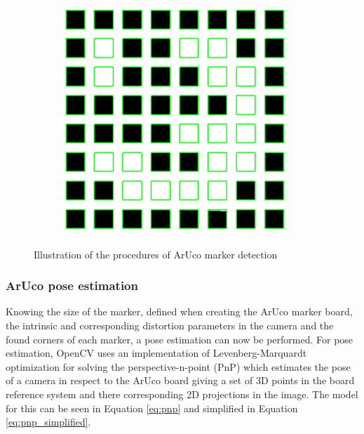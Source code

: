 \documentclass[../Head/report.tex]{subfiles}
\begin{document}
\begin{figure}[H]
\begin{subfigure}[b]{.15\textwidth}
        \caption{}
        \label{fig:aruco_detection4}
    \end{subfigure}
        \begin{subfigure}[b]{.154\textwidth}
        \centering
        \includegraphics[width=1\linewidth]{../Figures/aruco_detection5.png}
        \caption{}
        \label{fig:aruco_detection5}
         \vspace{-0.05cm}
    \end{subfigure}
    \caption{Illustration of the procedures of ArUco marker detection \cite{arucoMarkerDetection}}
    \label{fig:aruco_detection_procedure}
  
\end{figure}

\subsubsection{ArUco pose estimation}

Knowing the size of the marker, defined when creating the ArUco marker board, the intrinsic and corresponding distortion parameters in the camera and the found corners of each marker, a pose estimation can now be performed. For pose estimation, OpenCV uses an implementation of Levenberg-Marquardt optimization for solving the perspective-n-point (PnP) which estimates the pose of a camera in respect to the ArUco board giving a set of 3D points in the board reference system and there corresponding 2D projections in the image. The model for this can be seen in Equation \ref{eq:pnp} and simplified in Equation \ref{eq:pnp_simplified}.
\end{document}
